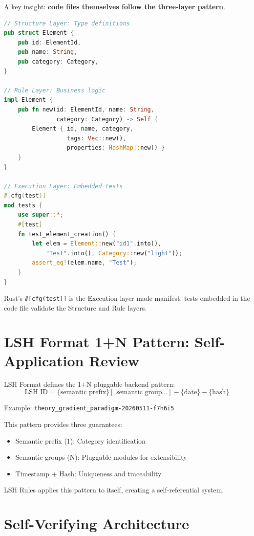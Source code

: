 \documentclass{article}
\begin{document}
A key insight: \textbf{code files themselves follow the three-layer pattern}.

\begin{lstlisting}[language=Rust, caption={Rust: Three-layer in code}]
// Structure Layer: Type definitions
pub struct Element {
    pub id: ElementId,
    pub name: String,
    pub category: Category,
}

// Rule Layer: Business logic
impl Element {
    pub fn new(id: ElementId, name: String,
               category: Category) -> Self {
        Element { id, name, category,
                  tags: Vec::new(),
                  properties: HashMap::new() }
    }
}

// Execution Layer: Embedded tests
#[cfg(test)]
mod tests {
    use super::*;
    #[test]
    fn test_element_creation() {
        let elem = Element::new("id1".into(),
            "Test".into(), Category::new("light"));
        assert_eq!(elem.name, "Test");
    }
}
\end{lstlisting}

Rust's \texttt{\#[cfg(test)]} is the Execution layer made manifest: tests embedded in the code file validate the Structure and Rule layers.

\section{LSH Format 1+N Pattern: Self-Application Review}

LSH Format defines the 1+N pluggable backend pattern:
\begin{equation}
\label{eq:lsh-format}
\text{LSH ID} = \{\text{semantic prefix}\}[\text{\_semantic group...}]-\{\text{date}\}-\{\text{hash}\}
\end{equation}

Example: \texttt{theory\_gradient\_paradigm-20260511-f7h6i5}

This pattern provides three guarantees:
\begin{itemize}
    \item Semantic prefix (1): Category identification
    \item Semantic groups (N): Pluggable modules for extensibility
    \item Timestamp + Hash: Uniqueness and traceability
\end{itemize}

LSH Rules applies this pattern to itself, creating a self-referential system.

\section{Self-Verifying Architecture}
\end{document}
